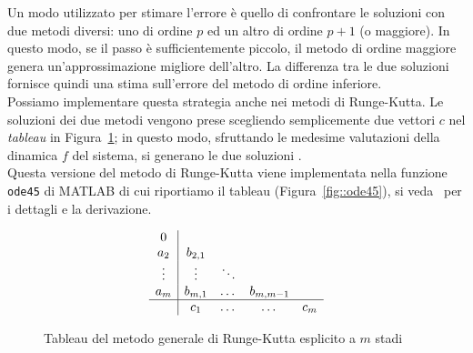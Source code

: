 Un modo utilizzato  per stimare l'errore  \`e quello di confrontare le soluzioni con  due metodi diversi: uno di ordine $p$ ed un altro di ordine $p+1$ (o maggiore). In questo modo, se il passo \`e sufficientemente piccolo,  il metodo di ordine maggiore genera un'approssimazione migliore dell'altro.  La differenza tra le due soluzioni fornisce quindi una stima sull'errore del metodo di ordine inferiore.\\
Possiamo implementare questa strategia anche nei metodi di Runge-Kutta.  Le soluzioni dei due metodi vengono prese scegliendo semplicemente due vettori $c$ nel \emph{tableau} in Figura~\ref{fig::tableau}; in questo modo, sfruttando le medesime valutazioni della dinamica $f$ del sistema, si generano le due soluzioni .\\
Questa versione del metodo di Runge-Kutta viene implementata nella funzione \texttt{ode45} di MATLAB di cui riportiamo il tableau (Figura~\ref{fig::ode45}), si veda~\cite{ode_matlab} per i dettagli e la derivazione.
\begin{figure}[!htb]
$$\begin{array}{c|cccc}
 0 & \\
 
 a_2 	& b_{2,1}	& 			& 			& 	\\
 \vdots & \vdots 	& \ddots 	&			&	\\
  a_m 	& b_{m,1}	& \dots		& b_{m,m-1}	&	\\
  \hline
		& c_1 		& \dots 	& \dots 	&c_m
\end{array}$$
	\caption{Tableau del metodo generale di Runge-Kutta esplicito a $m$ stadi}	
	\label{fig::tableau}
\end{figure}
